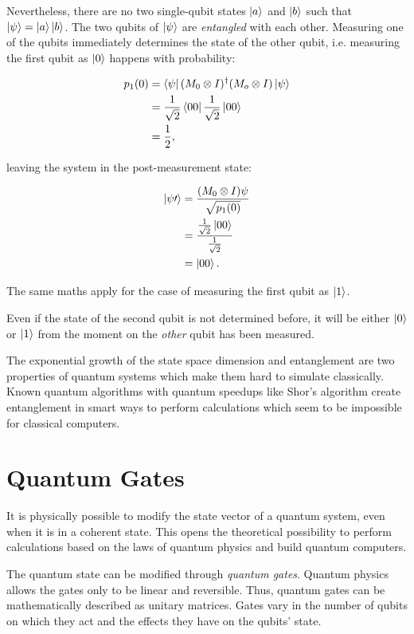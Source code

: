 Nevertheless, there are no two single-qubit states $\Ket{a}$
and $\Ket{b}$ such that $\Ket{\psi} = \Ket{a} \Ket{b}$. The two qubits of
$\Ket{\psi}$ are \textit{entangled} with each other. Measuring one of the qubits
immediately determines the state of the other qubit, i.e. measuring the first
qubit as $\Ket{0}$ happens with probability:

\begin{align}
  p_1(0) &= \Bra{\psi} (M_0 \otimes I)^{\dagger} (M_o \otimes I) \Ket{\psi} \\
         &= \frac{1}{\sqrt{2}} \Bra{00} \frac{1}{\sqrt{2}} \Ket{00} \\
         &= \frac{1}{2},
\end{align}

leaving the system in the post-measurement state:

\begin{align}
  \Ket{\psi\prime} &= \frac{(M_0 \otimes I) \psi}{\sqrt{p_1(0)}} \\
                   &= \frac{\frac{1}{\sqrt{2}} \Ket{00}}{\frac{1}{\sqrt{2}}} \\
                   &= \Ket{00}.
\end{align}

The same maths apply for the case of measuring the first qubit as $\Ket{1}$.

Even if the state of the second qubit is not determined before, it will be
either $\Ket{0}$ or $\Ket{1}$ from the moment on the \textit{other} qubit has been measured.

The exponential growth of the state space dimension and entanglement are two 
properties of quantum systems which make them hard to simulate
classically.
Known quantum algorithms with quantum speedups like Shor's algorithm
create entanglement in smart ways to perform calculations which seem
to be impossible for classical computers.

\section{Quantum Gates}

It is physically possible to modify the state vector of a quantum system, even
when it is in a coherent state. This opens the theoretical possibility to perform
calculations based on the laws of quantum physics and build quantum computers.

The quantum state can be modified through \textit{quantum gates}. 
Quantum physics allows the gates only to be linear and reversible. Thus,
quantum gates can be mathematically described as unitary matrices. Gates vary in the number of
qubits on which they act and the effects they have on the qubits' state.

